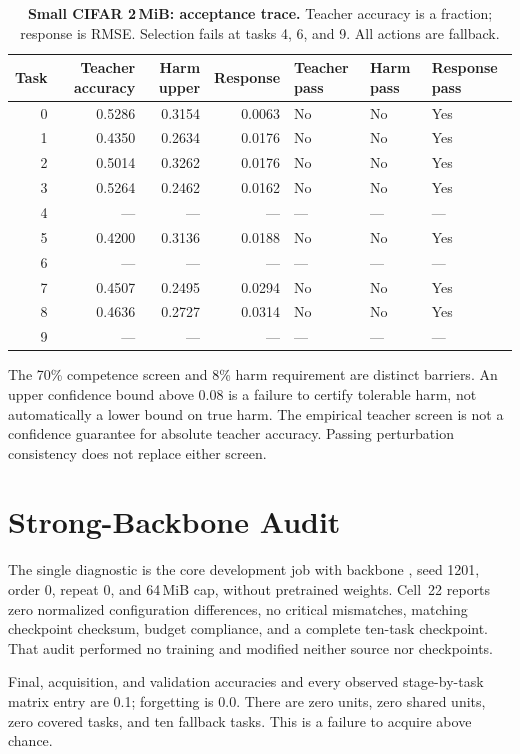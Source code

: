 \documentclass{article}
\begin{document}
\begin{table}[t]
\caption{\textbf{Small CIFAR 2\,MiB: acceptance trace.} Teacher accuracy is a fraction; response is RMSE. Selection fails at tasks 4, 6, and 9. All actions are fallback.}
\label{tab:small-decisions}\centering\small
\begin{tabular}{rrrrlll}\toprule
Task & Teacher accuracy & Harm upper & Response & Teacher pass & Harm pass & Response pass\\\midrule
0 & 0.5286 & 0.3154 & 0.0063 & No & No & Yes\\
1 & 0.4350 & 0.2634 & 0.0176 & No & No & Yes\\
2 & 0.5014 & 0.3262 & 0.0176 & No & No & Yes\\
3 & 0.5264 & 0.2462 & 0.0162 & No & No & Yes\\
4 & --- & --- & --- & --- & --- & ---\\
5 & 0.4200 & 0.3136 & 0.0188 & No & No & Yes\\
6 & --- & --- & --- & --- & --- & ---\\
7 & 0.4507 & 0.2495 & 0.0294 & No & No & Yes\\
8 & 0.4636 & 0.2727 & 0.0314 & No & No & Yes\\
9 & --- & --- & --- & --- & --- & ---\\
\bottomrule\end{tabular}\end{table}

The 70\% competence screen and 8\% harm requirement are distinct barriers. An upper confidence bound above 0.08 is a failure to certify tolerable harm, not automatically a lower bound on true harm. The empirical teacher screen is not a confidence guarantee for absolute teacher accuracy. Passing perturbation consistency does not replace either screen.

\section{Strong-Backbone Audit}
The single diagnostic is the core development job with backbone , seed 1201, order 0, repeat 0, and 64\,MiB cap, without pretrained weights. Cell~22 reports zero normalized configuration differences, no critical mismatches, matching checkpoint checksum, budget compliance, and a complete ten-task checkpoint. That audit performed no training and modified neither source nor checkpoints.

Final, acquisition, and validation accuracies and every observed stage-by-task matrix entry are 0.1; forgetting is 0.0. There are zero units, zero shared units, zero covered tasks, and ten fallback tasks. This is a failure to acquire above chance.
\end{document}

